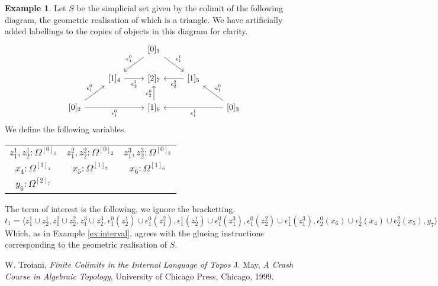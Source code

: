 \documentclass[12pt]{article}
\theoremstyle{plain}
\theoremstyle{definition}
\newtheorem{example}[thm]{Example}
\begin{document}
\begin{example}
	Let $S$ be the simplicial set given by the colimit of the following diagram, the geometric realisation of which is a triangle. We have artificially added labellings to the copies of objects in this diagram for clarity.
	\[\begin{tikzcd}
		&& {[0]_1} \\
		& {[1]_4} & {[2]_7} & {[1]_5} \\
		{[0]_2} && {[1]_6} && {[0]_3}
		\arrow["{\epsilon_1^0}"', from=1-3, to=2-2]
		\arrow["{\epsilon_1^0}", from=3-1, to=2-2]
		\arrow["{\epsilon_1^0}"', from=3-1, to=3-3]
		\arrow["{\epsilon_1^1}", from=3-5, to=3-3]
		\arrow["{\epsilon_1^0}"', from=3-5, to=2-4]
		\arrow["{\epsilon_1^1}", from=1-3, to=2-4]
		\arrow["{\epsilon_2^2}", from=2-4, to=2-3]
		\arrow["{\epsilon_2^1}"', from=2-2, to=2-3]
		\arrow["{\epsilon_2^0}", from=3-3, to=2-3]
	\end{tikzcd}\]
	We define the following variables.
	\begin{center}
		\begin{tabular}{c c c}
			$z^1_1,z^1_2: \Omega^{[0]_1}$ &$z^2_1,z^2_2: \Omega^{[0]_2}$ & $z^3_1,z^3_2: \Omega^{[0]_3}$\\
			$x_4 : \Omega^{[1]_4}$ & $x_5: \Omega^{[1]_5}$ & $x_6: \Omega^{[1]_6}$\\
			$y_6: \Omega^{[2]_7}$
		\end{tabular}
	\end{center}
	The term of interest is the following, we ignore the bracketting.
	\begin{equation}
		t_1 = \langle z_1^1 \cup z_2^1, z_1^2 \cup z_2^2, z_1^3 \cup z_2^3, \epsilon_1^0(z_2^1) \cup \epsilon_1^0(z_1^2), \epsilon_1^1(z_2^1) \cup \epsilon_1^0(z^3_1), \epsilon_1^0(z^2_2) \cup \epsilon_1^1(z^3_1), \epsilon_2^0(x_6) \cup \epsilon_2^1(x_4) \cup \epsilon_2^2(x_5), y_7\rangle
	\end{equation}
	Which, as in Example \ref{ex:interval}, agrees with the glueing instructions corresponding to the geometric realisation of $S$.
\end{example}
	
	\begin{thebibliography}{99}
		 W. Troiani, \emph{Finite Colimits in the Internal Language of  Topos}
		 J. May, \emph{A Crash Course in Algebraic Topology}, University of Chicago Press, Chicago, 1999.
		
	\end{thebibliography}
\end{document}
